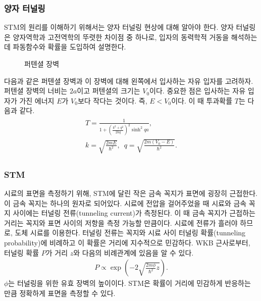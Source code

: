 \documentclass[aps,reprint,superscriptaddress]{revtex4-2}
\begin{document}
\subsubsection{양자 터널링}
STM의 원리를 이해하기 위해서는 양자 터널링 현상에 대해 알아야 한다. 양자 터널링은 양자역학과
고전역학의 뚜렷한 차이점 중 하나로, 입자의 동력학적 거동을 해석하는데 파동함수와 확률을
도입하여 설명한다. 
\begin{figure}[htbp]
  \centering
  \caption{퍼텐셜 장벽}
  \label{<label>}
\end{figure}
다음과 같은 퍼텐셜 장벽과 이 장벽에 대해 왼쪽에서 입사하는 자유 입자를 
고려하자. 퍼텐셜 장벽의 너비는 $2a$이고 퍼텐셜의 크기는 $V_0$이다. 중요한 점은 입사하는
자유 입자가 가진 에너지 $E$가 $V_0$보다 작다는 것이다. 즉, $E<V_0$이다. 이 때 투과확률 $T$는
다음과 같다.
\begin{align}
  \begin{split}
    T=\frac{1}{1+\left(\frac{k^2+q^2}{2kq}\right)^2\sinh^2qa},\,\,\,\\
    k=\sqrt{\frac{2mE}{\hbar^2}},\,\,\,
    q=\sqrt{\frac{2m(V_0-E)}{\hbar^2}}.
  \end{split}
\end{align}

\subsubsection{STM}
시료의 표면을 측정하기 위해, STM에 달린 작은 금속 꼭지가 표면에 굉장히 근접한다. 이 금속
꼭지는 하나의 원자로 되어있다. 시료에 전압을 걸어주었을 때 시료와 금속 꼭지 사이에는 
터널링 전류(tunneling current)가 측정된다. 이 때 금속 꼭지가 근접하는 거리는 꼭지와
표면 사이의 저항을 측정 가능할 만큼이다. 시료에 전류가 흘러야 하므로, 도체 시료를 이용한다.
터널링 전류는 꼭지와 시료 사이 터널링 확률(tunneling probability)에 비례하고 이 확률은
거리에 지수적으로 민감하다. WKB 근사로부터, 터널링 확률 $P$가 거리 $z$와 다음의 비례관계에 
있음을 알 수 있다.
\begin{align}
   P \propto \exp\left(-2\sqrt{\frac{2m\phi}{\hbar^2}z}\right).
\end{align}
$\phi$는 터널링을 위한 유효 장벽의 높이이다. STM은 확률이 거리에 민감하게 반응하는 만큼
정확하게 표면을 측정할 수 있다.
\end{document}
